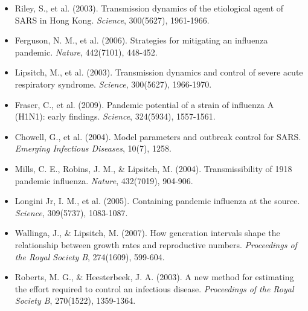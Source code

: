 \documentclass[a4paper, 11pt]{article}
\begin{document}
\begin{itemize}
of infectious diseases. \textit{PLoS Medicine}, 2(7), e174.
\item Riley, S., et al. (2003). Transmission dynamics of the etiological agent of SARS in
Hong Kong. \textit{Science}, 300(5627), 1961-1966.
\item Ferguson, N. M., et al. (2006). Strategies for mitigating an influenza pandemic.
\textit{Nature}, 442(7101), 448-452.
\item Lipsitch, M., et al. (2003). Transmission dynamics and control of severe acute respiratory
syndrome. \textit{Science}, 300(5627), 1966-1970.
\item Fraser, C., et al. (2009). Pandemic potential of a strain of influenza A (H1N1): early
findings. \textit{Science}, 324(5934), 1557-1561.
\item Chowell, G., et al. (2004). Model parameters and outbreak control for SARS.
\textit{Emerging Infectious Diseases}, 10(7), 1258.
\item Mills, C. E., Robins, J. M., \& Lipsitch, M. (2004). Transmissibility of 1918 pandemic
influenza. \textit{Nature}, 432(7019), 904-906.
\item Longini Jr, I. M., et al. (2005). Containing pandemic influenza at the source.
\textit{Science}, 309(5737), 1083-1087.
\item Wallinga, J., \& Lipsitch, M. (2007). How generation intervals shape the relationship
between growth rates and reproductive numbers. \textit{Proceedings of the Royal Society B},
274(1609), 599-604.
\item Roberts, M. G., \& Heesterbeek, J. A. (2003). A new method for estimating the effort
required to control an infectious disease. \textit{Proceedings of the Royal Society B},
270(1522), 1359-1364.
\end{itemize}
\end{document}
